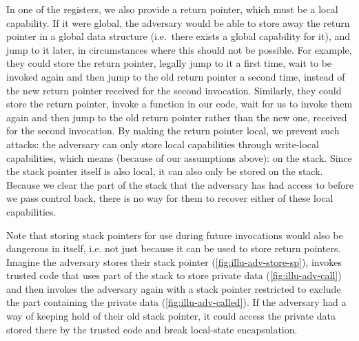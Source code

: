 \documentclass[format=acmsmall, review=true, screen=true]{acmart}
\renewcommand{\sectionname}{Section}
\newcommand\lau[1]{{\color{purple} \sf \footnotesize {LS: #1}}\\}
\renewcommand\lau[1]{}
\begin{document}
In one of the registers, we also provide a return pointer, which must be a local
capability. If it were global, the adversary would be able to store away the
return pointer in a global data structure (i.e.\ there exists a global capability for it), and jump to it later, in
circumstances where this should not be possible. For example, they could store
the return pointer, legally jump to it a first time, wait to be invoked again
and then jump to the old return pointer a second time, instead of the new return
pointer received for the second invocation. Similarly, they could store the
return pointer, invoke a function in our code, wait for us to invoke them again
and then jump to the old return pointer rather than the new one, received for the
second invocation.
%
By making the return pointer local, we prevent such attacks: the adversary can
only store local capabilities through write-local capabilities, which means (because
of our assumptions above): on the stack. Since the stack pointer itself is
also local, it can also only be stored on the stack. Because we clear the part
of the stack that the adversary has had access to before we pass control back,
there is no way for them to recover either of these local capabilities.

Note that storing stack pointers for use during future invocations would also be
dangerous in itself, i.e. not just because it can be used to store return
pointers. Imagine the adversary stores their stack pointer (\ref{fig:illu-adv-store-sp}), invokes trusted code
that uses part of the stack to store private data (\ref{fig:illu-adv-call}) and then invokes the adversary
again with a stack pointer restricted to exclude the part containing the private
data (\ref{fig:illu-adv-called}). If the adversary had a way of keeping hold of their old stack pointer, it
could access the private data stored there by the trusted code and break
local-state encapsulation.  
\end{document}
